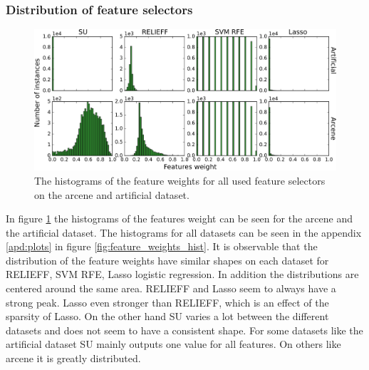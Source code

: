 \documentclass[twoside,11pt]{article}
\begin{document}
\subsubsection{Distribution of feature selectors}
\begin{figure}[h!]
  \centering
    \includegraphics[width=\textwidth]{images/feature_weights_hist_arcene_artificial.png}
  \caption{The histograms of the feature weights for all used feature selectors on the arcene and artificial dataset.}
  \label{fig:feature_weights_hist_arcene_artificial}
\end{figure}

In figure \ref{fig:feature_weights_hist_arcene_artificial} the histograms of the features weight can be seen for the arcene and the artificial dataset. The histograms for all datasets can be seen in the appendix \ref{apd:plots} in figure \ref{fig:feature_weights_hist}.
It is observable that the distribution of the feature weights have similar shapes on each dataset for RELIEFF, SVM RFE, Lasso logistic regression. In addition the distributions are centered around the same area. RELIEFF and Lasso seem to always have a strong peak. Lasso even stronger than RELIEFF, which is an effect of the sparsity of Lasso. On the other hand SU varies a lot between the different datasets and does not seem to have a consistent shape. For some datasets like the artificial dataset SU mainly outputs one value for all features. On others like arcene it is greatly distributed. 
\end{document}
